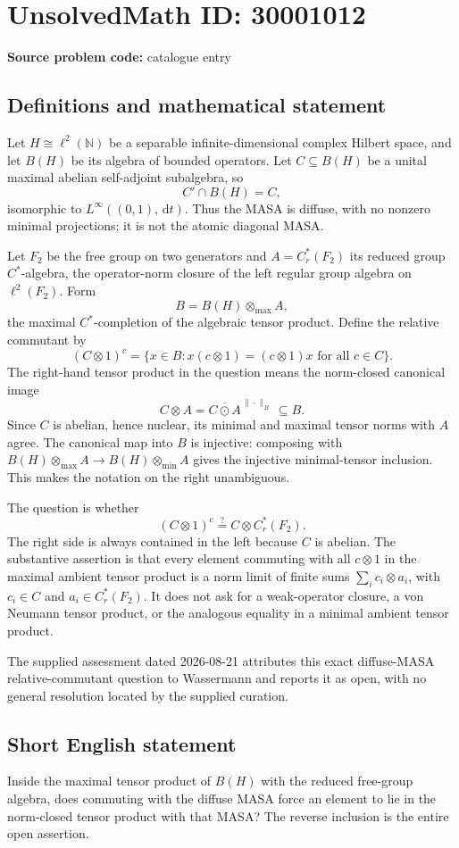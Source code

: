 \documentclass[11pt]{article}
\newcommand{\N}{\mathbb{N}}
\newcommand{\dd}{\,\mathrm{d}}
\begin{document}
\section*{UnsolvedMath ID: 30001012}
\textbf{Source problem code:} catalogue entry
\subsection{Definitions and mathematical statement}
Let \(H\cong\ell^2(\N)\) be a separable infinite-dimensional complex Hilbert space, and let \(B(H)\) be its algebra of bounded operators. Let \(C\subseteq B(H)\) be a unital maximal abelian self-adjoint subalgebra, so
\[
 C'\cap B(H)=C,
\]
isomorphic to \(L^\infty((0,1),\dd t)\). Thus the MASA is diffuse, with no nonzero minimal projections; it is not the atomic diagonal MASA.

Let \(F_2\) be the free group on two generators and \(A=C_r^*(F_2)\) its reduced group \(C^*\)-algebra, the operator-norm closure of the left regular group algebra on \(\ell^2(F_2)\). Form
\[
 B=B(H)\otimes_{\max}A,
\]
the maximal \(C^*\)-completion of the algebraic tensor product. Define the relative commutant by
\[
 (C\otimes1)^c=\{x\in B:x(c\otimes1)=(c\otimes1)x\text{ for all }c\in C\}.
\]
The right-hand tensor product in the question means the norm-closed canonical image
\[
 C\otimes A=\overline{C\odot A}^{\,\|\cdot\|_B}\ \subseteq B.
\]
Since \(C\) is abelian, hence nuclear, its minimal and maximal tensor norms with \(A\) agree. The canonical map into \(B\) is injective: composing with \(B(H)\otimes_{\max}A\to B(H)\otimes_{\min}A\) gives the injective minimal-tensor inclusion. This makes the notation on the right unambiguous.

The question is whether
\[
 (C\otimes1)^c\stackrel{?}{=}C\otimes C_r^*(F_2).
\]
The right side is always contained in the left because \(C\) is abelian. The substantive assertion is that every element commuting with all \(c\otimes1\) in the maximal ambient tensor product is a norm limit of finite sums \(\sum_i c_i\otimes a_i\), with \(c_i\in C\) and \(a_i\in C_r^*(F_2)\). It does not ask for a weak-operator closure, a von Neumann tensor product, or the analogous equality in a minimal ambient tensor product.

The supplied assessment dated 2026-08-21 attributes this exact diffuse-MASA relative-commutant question to Wassermann and reports it as open, with no general resolution located by the supplied curation.
\subsection{Short English statement}
Inside the maximal tensor product of \(B(H)\) with the reduced free-group algebra, does commuting with the diffuse MASA force an element to lie in the norm-closed tensor product with that MASA? The reverse inclusion is the entire open assertion.
\end{document}
